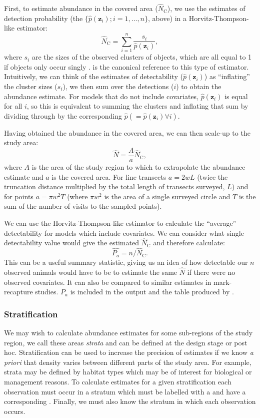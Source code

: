\documentclass[article]{jss}\usepackage[]{graphicx}\usepackage[]{color}
\begin{document}
First, to estimate abundance in the covered area ($\hat{N}_\text{C}$), we use the estimates of detection probability (the $\{\hat{p}(\mathbf{z}_i); i=1,\ldots,n\}$, above) in a Horvitz-Thompson-like estimator:
\begin{equation}
\hat{N}_\text{C} = \sum_{i=1}^n\frac{s_i}{\hat{p}(\mathbf{z}_i)},
\label{ht}
\end{equation}
where $s_i$ are the sizes of the observed clusters of objects, which are all equal to 1 if objects only occur singly \citep{Borchers:2004wr}. \cite{thompson2012sampling} is the canonical reference to this type of estimator. Intuitively, we can think of the estimates of detectability ($\hat{p}(\mathbf{z}_i)$) as ``inflating'' the cluster sizes ($s_i$), we then sum over the detections ($i$) to obtain the abundance estimate. For models that do not include covariates, $\hat{p}(\mathbf{z}_i)$ is equal for all $i$, so this is equivalent to summing the clusters and inflating that sum by dividing through by the corresponding $\hat{p} (=\hat{p}(\mathbf{z}_i) \forall i)$.

Having obtained the abundance in the covered area, we can then scale-up to the study area:
$$
\hat{N} = \frac{A}{a} \hat{N}_\text{C},
$$
where $A$ is the area of the study region to which to extrapolate the abundance estimate and $a$ is the covered area. For line transects $a=2wL$ (twice the truncation distance multiplied by the total length of transects surveyed, $L$) and for points $a=\pi w^2 T$ (where $\pi w^2$ is the area of a single surveyed circle and $T$ is the sum of the number of visits to the sampled points).

We can use the Horvitz-Thompson-like estimator to calculate the ``average'' detectability for models which include covariates. We can consider what single detectability value would give the estimated $\hat{N}_\text{C}$ and therefore calculate:
$$
\hat{P_a} = n/\hat{N}_\text{C}.
$$
This can be a useful summary statistic, giving us an idea of how detectable our $n$ observed animals would have to be to estimate the same $\hat{N}$ if there were no observed covariates. It can also be compared to similar estimates in mark-recapture studies. $P_a$ is included in the  output and the table produced by .

\subsubsection{Stratification}

We may wish to calculate abundance estimates for some sub-regions of the study region, we call these areas \textit{strata} and can be defined at the design stage or post hoc. Stratification can be used to increase the precision of estimates if we know \textit{a priori} that density varies between different parts of the study area. For example, strata may be defined by habitat types which may be of interest for biological or management reasons. To calculate estimates for a given stratification each observation must occur in a stratum which must be labelled with a  and have a corresponding . Finally, we must also know the stratum in which each observation occurs.
\end{document}
